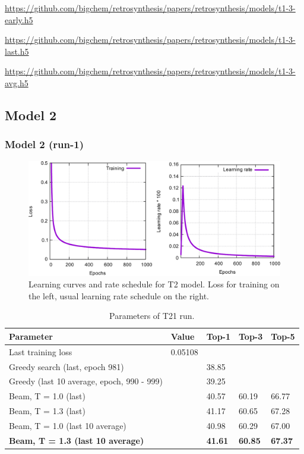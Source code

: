\documentclass{article}
\begin{document}
\url{https://github.com/bigchem/retrosynthesis/papers/retrosynthesis/models/t1-3-early.h5}

\url{https://github.com/bigchem/retrosynthesis/papers/retrosynthesis/models/t1-3-last.h5}

\url{https://github.com/bigchem/retrosynthesis/papers/retrosynthesis/models/t1-3-avg.h5}

\newpage
\subsection{Model 2}
\subsubsection{Model 2 (run-1)}
 
\begin{figure}[h!]
  \centering
  \includegraphics[width = 16.5cm]{images/t2-1.pdf}
  \caption{Learning curves and rate schedule for T2 model. Loss for training on the left, usual learning rate schedule on the right.}
  \label{fig:t21}
\end{figure}

\begin{table}[h!]
\caption{Parameters of T21 run.}
  \centering
  \begin{tabular}{p{8.2cm}p{1.5cm}p{1.5cm}p{1.5cm}p{1.5cm}}
    \toprule
    Parameter & Value & Top-1 & Top-3 & Top-5 \\
    \midrule
    Last training loss & 0.05108 & & & \\
    \midrule
    Greedy search (last, epoch 981) & & 38.85 & & \\
    Greedy (last 10 average, epoch, 990 - 999) & & 39.25 & & \\
    \midrule
    Beam, T = 1.0 (last) & & 40.57 &60.19  & 66.77 \\
    Beam, T = 1.3 (last) & & 41.17 & 60.65 &  67.28 \\ 
    \midrule
    Beam, T = 1.0 (last 10 average) & & 40.98 & 60.29 & 67.00 \\
    \textbf{Beam, T = 1.3 (last 10 average)} & &  \textbf{41.61} & \textbf{60.85} & \textbf{67.37} \\ 
    \bottomrule
  \end{tabular}
  \label{tbl:t21}

\end{table} 
\end{document}
